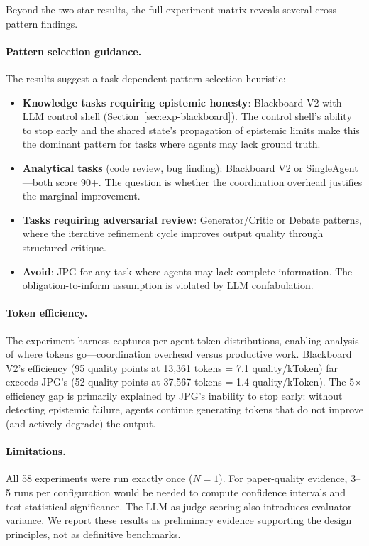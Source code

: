 \documentclass{article}
\begin{document}
Beyond the two star results, the full experiment matrix reveals several cross-pattern
findings.

\paragraph{Pattern selection guidance.}
The results suggest a task-dependent pattern selection heuristic:
\begin{itemize}[nosep]
  \item \textbf{Knowledge tasks requiring epistemic honesty}: Blackboard V2 with LLM
    control shell (Section~\ref{sec:exp-blackboard}). The control shell's ability to
    stop early and the shared state's propagation of epistemic limits make this the
    dominant pattern for tasks where agents may lack ground truth.
  \item \textbf{Analytical tasks} (code review, bug finding): Blackboard V2 or
    SingleAgent---both score 90+. The question is whether the coordination overhead
    justifies the marginal improvement.
  \item \textbf{Tasks requiring adversarial review}: Generator/Critic or Debate
    patterns, where the iterative refinement cycle improves output quality through
    structured critique.
  \item \textbf{Avoid}: JPG for any task where agents may lack complete information.
    The obligation-to-inform assumption is violated by LLM confabulation.
\end{itemize}

\paragraph{Token efficiency.}
The experiment harness captures per-agent token distributions, enabling analysis of
where tokens go---coordination overhead versus productive work. Blackboard V2's
efficiency (95 quality points at 13,361 tokens = 7.1 quality/kToken) far exceeds
JPG's (52 quality points at 37,567 tokens = 1.4 quality/kToken). The 5$\times$
efficiency gap is primarily explained by JPG's inability to stop early: without
detecting epistemic failure, agents continue generating tokens that do not improve
(and actively degrade) the output.

\paragraph{Limitations.}
All 58 experiments were run exactly once ($N{=}1$). For paper-quality evidence,
3--5 runs per configuration would be needed to compute confidence intervals and
test statistical significance. The LLM-as-judge scoring also introduces evaluator
variance. We report these results as preliminary evidence supporting the design
principles, not as definitive benchmarks.
\end{document}
